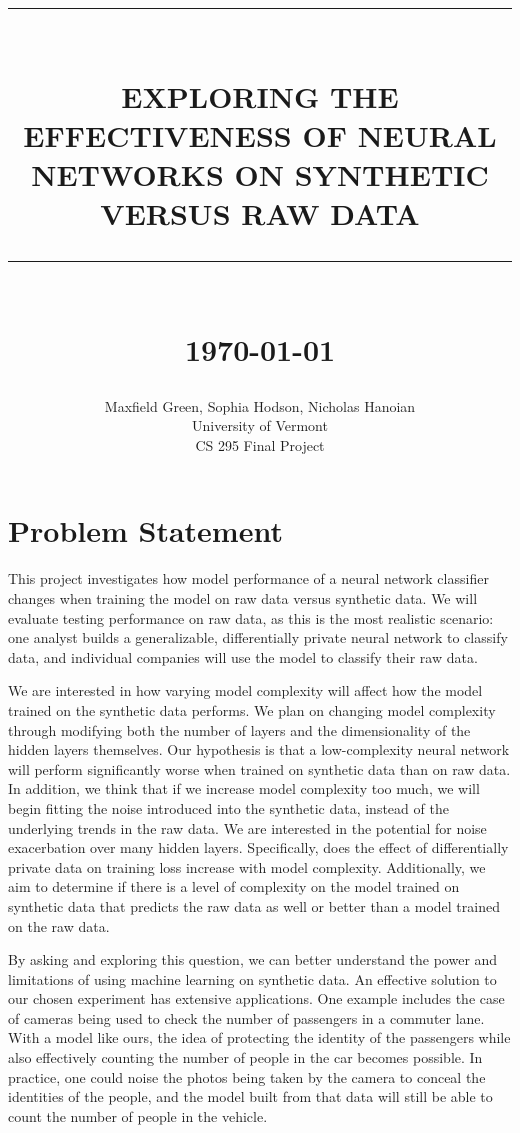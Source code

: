 \documentclass[12pt]{report}
\newcommand{\HRule}[1]{\rule{\linewidth}{#1}}
\begin{document}
\title{ \normalsize \textsc{}
		\\ [2.0cm]
		\HRule{0.5pt} \\
		\LARGE \textbf{\uppercase{Exploring the Effectiveness of Neural Networks on Synthetic Versus Raw Data}}
		\HRule{2pt} \\ [0.5cm]
		\normalsize \today \vspace*{5\baselineskip}}

\date{}

\author{
    	Maxfield Green, Sophia Hodson, Nicholas Hanoian \\ 
		University of Vermont \\
		CS 295 Final Project }
\maketitle
\newpage
\section{Problem Statement}
This project investigates how model performance of a neural network classifier changes when training the model on raw data versus synthetic data. We will evaluate testing performance on raw data, as this is the most realistic scenario: one analyst builds a generalizable, differentially private neural network to classify data, and individual companies will use the model to classify their raw data. 

We are interested in how varying model complexity will affect how the model trained on the synthetic data performs. We plan on changing model complexity through modifying both the number of layers and the dimensionality of the hidden layers themselves. Our hypothesis is that a low-complexity neural network will perform significantly worse when trained on synthetic data than on raw data. In addition, we think that if we increase model complexity too much, we will begin fitting the noise introduced into the synthetic data, instead of the underlying trends in the raw data. We are interested in the potential for noise exacerbation over many hidden layers. Specifically, does the effect of differentially private data on training loss increase with model complexity. Additionally, we aim to determine if there is a level of complexity on the model trained on synthetic data that predicts the raw data as well or better than a model trained on the raw data. 

By asking and exploring this question, we can better understand the power and limitations of using machine learning on synthetic data. An effective solution to our chosen experiment has extensive applications. One example includes the case of cameras being used to check the number of passengers in a commuter lane. With a model like ours, the idea of protecting the identity of the passengers while also effectively counting the number of people in the car becomes possible. In practice, one could noise the photos being taken by the camera to conceal the identities of the people, and the model built from that data will still be able to count the number of people in the vehicle.
\end{document}
